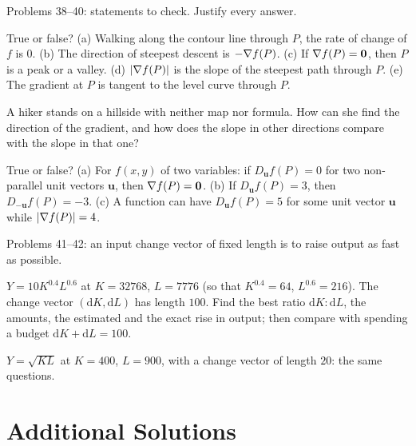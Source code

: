 Problems 38--40: statements to check. Justify every answer.

\begin{problems}[resume]
  \item True or false? (a) Walking along the contour line through $P$,
        the rate of change of $f$ is $0$. (b) The direction of steepest
        descent is $-\nabla f(P)$. (c) If $\nabla f(P)=\mathbf{0}$, then $P$
        is a peak or a valley. (d) $|\nabla f(P)|$ is the slope of the
        steepest path through $P$. (e) The gradient at $P$ is tangent to
        the level curve through $P$.
  \item A hiker stands on a hillside with neither map nor formula. How can
        she find the direction of the gradient, and how does the slope in
        other directions compare with the slope in that one?
  \item True or false? (a) For $f(x,y)$ of two variables: if
        $D_{\mathbf{u}}f(P)=0$ for two non-parallel unit vectors $\mathbf{u}$, then $\nabla f(P)=\mathbf{0}$. (b) If
        $D_{\mathbf{u}}f(P)=3$, then $D_{-\mathbf{u}}f(P)=-3$. (c) A
        function can have $D_{\mathbf{u}}f(P)=5$ for some unit vector
        $\mathbf{u}$ while $|\nabla f(P)|=4$.
\end{problems}

Problems 41--42: an input change vector of fixed length is to raise output
as fast as possible.

\begin{problems}[resume]
  \item $Y=10K^{0.4}L^{0.6}$ at $K=32768$, $L=7776$ (so that
        $K^{0.4}=64$, $L^{0.6}=216$). The change vector
        $(\mathrm{d}K,\mathrm{d}L)$ has length $100$. Find the best ratio
        $\mathrm{d}K:\mathrm{d}L$, the amounts, the estimated and the exact
        rise in output; then compare with spending a budget
        $\mathrm{d}K+\mathrm{d}L=100$.
  \item $Y=\sqrt{KL}$ at $K=400$, $L=900$, with a change vector of length
        $20$: the same questions.
\end{problems}

\section{Additional Solutions}

